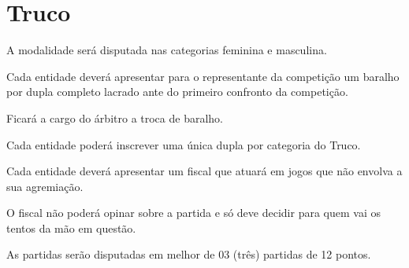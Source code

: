 {\let\clearpage\relax \chapter{Truco}}

\begin{article}
	A modalidade será disputada nas categorias feminina e masculina.
\end{article}

\begin{article}
	Cada entidade deverá apresentar para o representante da competição um baralho por dupla completo lacrado ante do primeiro confronto da competição.

	\begin{xparagraph}
		Ficará a cargo do árbitro a troca de baralho.
	\end{xparagraph}
\end{article}

\begin{article}
	Cada entidade poderá inscrever uma única dupla por categoria do Truco.
\end{article}

\begin{article}
	Cada entidade deverá apresentar um fiscal que atuará em jogos que não envolva a sua agremiação.

	\begin{xparagraph}
		O fiscal não poderá opinar sobre a partida e só deve decidir para quem vai os tentos da mão em questão.
	\end{xparagraph}
\end{article}

\begin{article}
	As partidas serão disputadas em melhor de 03 (três) partidas de 12 pontos.
\end{article}

